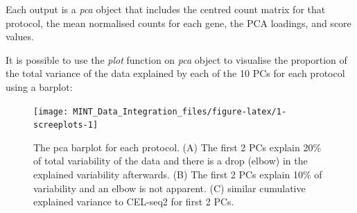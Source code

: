 \documentclass[]{book}
\newenvironment{Shaded}{\begin{snugshade}}{\end{snugshade}}
\newcommand{\CommentTok}[1]{\textcolor[rgb]{0.56,0.35,0.01}{\textit{#1}}}
\newcommand{\DataTypeTok}[1]{\textcolor[rgb]{0.13,0.29,0.53}{#1}}
\newcommand{\DecValTok}[1]{\textcolor[rgb]{0.00,0.00,0.81}{#1}}
\newcommand{\FloatTok}[1]{\textcolor[rgb]{0.00,0.00,0.81}{#1}}
\newcommand{\KeywordTok}[1]{\textcolor[rgb]{0.13,0.29,0.53}{\textbf{#1}}}
\newcommand{\NormalTok}[1]{#1}
\newcommand{\OperatorTok}[1]{\textcolor[rgb]{0.81,0.36,0.00}{\textbf{#1}}}
\newcommand{\StringTok}[1]{\textcolor[rgb]{0.31,0.60,0.02}{#1}}
\theoremstyle{definition}
\theoremstyle{definition}
\theoremstyle{definition}
\theoremstyle{remark}
\begin{document}
Each output is a \emph{pca} object that includes the centred count
matrix for that protocol, the mean normalised counts for each gene, the
PCA loadings, and score values.

It is possible to use the \emph{plot} function on \emph{pca} object to
visualise the proportion of the total variance of the data explained by
each of the 10 PCs for each protocol using a barplot:

\begin{Shaded}
\end{Shaded}

\begin{figure}[ht]

{\centering \texttt{[image: MINT\_Data\_Integration\_files/figure-latex/1-screeplots-1]} 

}

\caption{The pca barplot for each protocol. (A) The first 2 PCs explain 20\% of total variability of the data and there is a drop (elbow) in the explained variability afterwards. (B) The first 2 PCs explain 10\% of variability and an elbow is not apparent. (C) similar cumulative explained variance to CEL-seq2 for first 2 PCs.}\label{fig:1-screeplots}
\end{figure}
\end{document}
